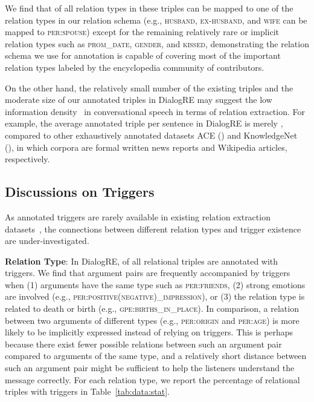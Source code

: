 \documentclass[11pt,a4paper]{article}
\newcommand{\eg}{{e.g.}}
\begin{document}
We find that  of all  relation types in these triples can be mapped to one of the  relation types in our relation schema (\eg, \textsc{husband}, \textsc{ex-husband}, and \textsc{wife} can be mapped to \textsc{per:spouse}) except for the remaining relatively rare or implicit relation types such as \textsc{prom\_date}, \textsc{gender}, and \textsc{kissed}, demonstrating the relation schema we use for annotation is capable of covering most of the important relation types labeled by the encyclopedia community of contributors. 

On the other hand, the relatively small number of the existing triples and the moderate size of our annotated triples in DialogRE may suggest the low information density~\cite{wang-liu-2011-summarization} in conversational speech in terms of relation extraction. For example, the average annotated triple per sentence in DialogRE is merely , compared to other exhaustively annotated datasets ACE () and KnowledgeNet~\cite{mesquita-etal-2019-knowledgenet} (), in which corpora are formal written news reports and Wikipedia articles, respectively. 






\subsection{Discussions on Triggers}
As annotated triggers are rarely available in existing relation extraction datasets~\cite{aguilar-2014-comparison}, the connections between different relation types and trigger existence are under-investigated. 

\medskip

\noindent \textbf{Relation Type}: In DialogRE,  of all relational triples are annotated with triggers. We find that argument pairs are frequently accompanied by triggers when (1) arguments have the same type such as \textsc{per:friends}, (2) strong emotions are involved (\eg, \textsc{per:positive(negative)\_impression}), or (3) the relation type is related to death or birth (\eg, \textsc{gpe:births\_in\_place}). In comparison, a relation between two arguments of different types (\eg, \textsc{per:origin} and \textsc{per:age}) is more likely to be implicitly expressed instead of relying on triggers. This is perhaps because there exist fewer possible relations between such an argument pair compared to arguments of the same type, and a relatively short distance between such an argument pair might be sufficient to help the listeners understand the message correctly. For each relation type, we report the percentage of relational triples with triggers in Table~\ref{tab:data:stat}. 
\end{document}

